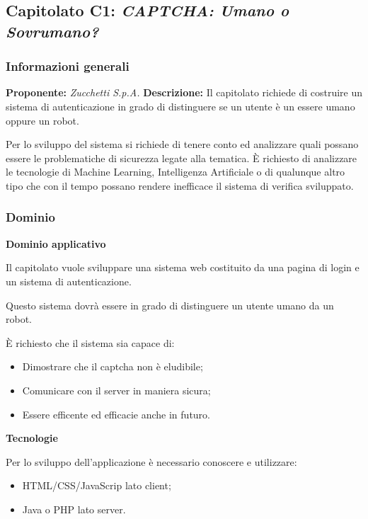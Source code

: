 \subsection{Capitolato C1: \textit{CAPTCHA: Umano o Sovrumano?}}

\subsubsection{Informazioni generali}

\textbf{Proponente:} \textit{Zucchetti S.p.A.}
\textbf{Descrizione:}
Il capitolato richiede di costruire un sistema di autenticazione in grado di distinguere se un utente è un essere umano oppure un robot.

Per lo sviluppo del sistema si richiede di tenere conto ed analizzare quali possano essere le problematiche di sicurezza legate alla tematica. È richiesto di analizzare le tecnologie di Machine Learning, Intelligenza Artificiale o di qualunque altro tipo che con il tempo possano rendere inefficace il sistema di verifica sviluppato.

\subsubsection{Dominio}

\textbf{Dominio applicativo}

Il capitolato vuole sviluppare una sistema web costituito da una pagina di login e un sistema di autenticazione.

Questo sistema dovrà essere in grado di distinguere un utente umano da un robot.

È richiesto che il sistema sia capace di:
\begin{itemize}
    \item Dimostrare che il captcha non è eludibile;
    \item Comunicare con il server in maniera sicura;
    \item Essere efficente ed efficacie anche in futuro.
\end{itemize}

\textbf{Tecnologie}

Per lo sviluppo dell'applicazione è necessario conoscere e utilizzare:
\begin{itemize}
    \item HTML/CSS/JavaScrip lato client;
    \item Java o PHP lato server.
\end{itemize}

